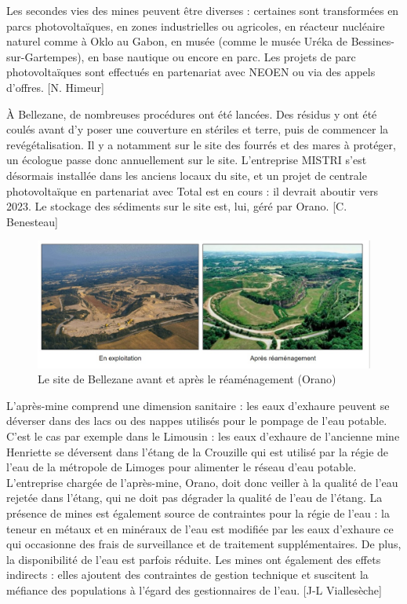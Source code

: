 \documentclass{article}
\begin{document}
Les secondes vies des mines peuvent être diverses : certaines sont transformées en parcs photovoltaïques, en zones industrielles ou agricoles, en réacteur nucléaire naturel comme à Oklo au Gabon, en musée (comme le musée Uréka de Bessines-sur-Gartempes), en base nautique ou encore en parc. Les projets de parc photovoltaïques sont effectués en partenariat avec NEOEN ou via des appels d’offres. [N. Himeur]

À Bellezane, de nombreuses procédures ont été lancées. Des résidus y ont été coulés avant d’y poser une couverture en stériles et terre, puis de commencer la revégétalisation. Il y a notamment sur le site des fourrés et des mares à protéger, un écologue passe donc annuellement sur le site. L’entreprise MISTRI s’est désormais installée dans les anciens locaux du site, et un projet de centrale photovoltaïque en partenariat avec Total est en cours : il devrait aboutir vers 2023. Le stockage des sédiments sur le site est, lui, géré par Orano. [C. Benesteau]

\begin{figure}[!hbt]
    \centering
    \includegraphics[width=\linewidth]{I_B_2.jpg}
    \caption{Le site de Bellezane avant et après le réaménagement (Orano)}
    \label{fig:bellezane_avant_apres}
\end{figure}

L’après-mine comprend une dimension sanitaire : les eaux d’exhaure peuvent se déverser dans des lacs ou des nappes utilisés pour le pompage de l’eau potable. C’est le cas par exemple dans le Limousin : les eaux d’exhaure de l’ancienne mine Henriette se déversent dans l’étang de la Crouzille qui est utilisé par la régie de l’eau de la métropole de Limoges pour alimenter le réseau d’eau potable. L’entreprise chargée de l’après-mine, Orano, doit donc veiller à la qualité de l’eau rejetée dans l’étang, qui ne doit pas dégrader la qualité de l’eau de l’étang. La présence de mines est également source de contraintes pour la régie de l’eau : la teneur en métaux et en minéraux de l’eau est modifiée par les eaux d’exhaure ce qui occasionne des frais de surveillance et de traitement supplémentaires. De plus, la disponibilité de l’eau est parfois réduite. Les mines ont également des effets indirects : elles ajoutent des contraintes de gestion technique et suscitent la méfiance des populations à l’égard des gestionnaires de l’eau. [J-L Viallesèche]
\end{document}
